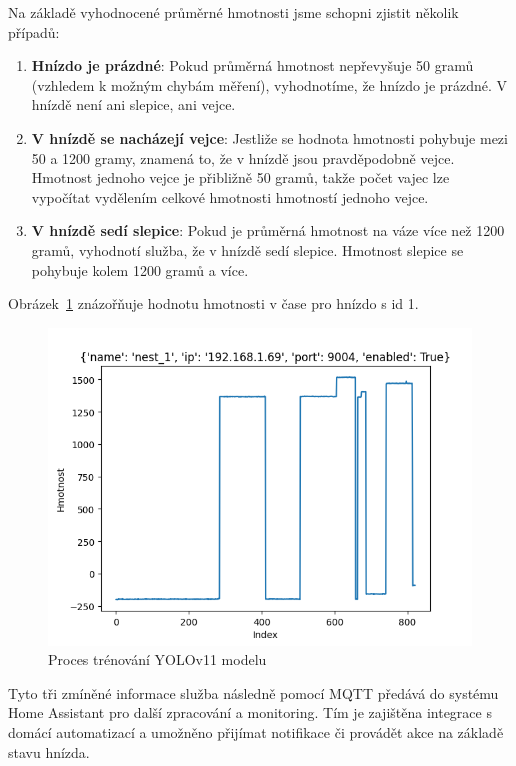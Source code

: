 Na základě vyhodnocené průměrné hmotnosti jsme schopni zjistit několik případů:
\begin{enumerate}
    \item \textbf{Hnízdo je prázdné}: Pokud průměrná hmotnost nepřevyšuje 50 gramů (vzhledem k možným chybám měření), vyhodnotíme, že hnízdo je prázdné. V hnízdě není ani slepice, ani vejce.
    \item \textbf{V hnízdě se nacházejí vejce}: Jestliže se hodnota hmotnosti pohybuje mezi 50 a 1200 gramy, znamená to, že v hnízdě jsou pravděpodobně vejce. Hmotnost jednoho vejce je přibližně 50 gramů, takže počet vajec lze vypočítat vydělením celkové hmotnosti hmotností jednoho vejce.
    \item \textbf{V hnízdě sedí slepice}: Pokud je průměrná hmotnost na váze více než 1200 gramů, vyhodnotí služba, že v hnízdě sedí slepice. Hmotnost slepice se pohybuje kolem 1200 gramů a více.
\end{enumerate}

Obrázek~\ref{fig:weight_egg_chart_timeline} znázořňuje hodnotu hmotnosti v čase pro hnízdo s id 1.

\begin{figure}[h]
    \centering
    \includegraphics[width=\textwidth]{img/weight_egg_chart_timeline}
    \caption{Proces trénování YOLOv11 modelu}
    \label{fig:weight_egg_chart_timeline}
\end{figure}

Tyto tři zmíněné informace služba následně pomocí MQTT předává do systému Home Assistant pro další zpracování a monitoring. Tím je zajištěna integrace s domácí automatizací a umožněno přijímat notifikace či provádět akce na základě stavu hnízda.

